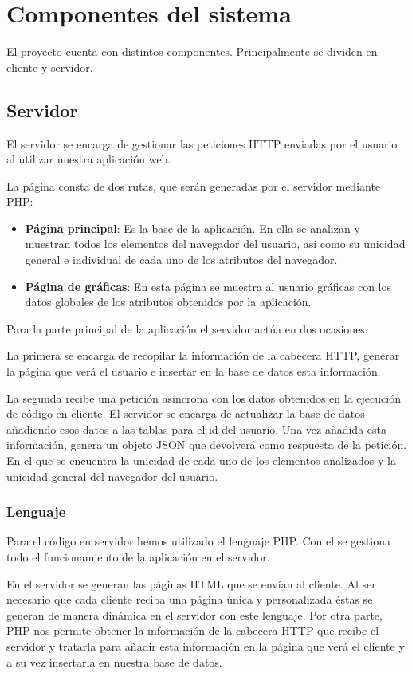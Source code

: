 \section{Componentes del sistema}
El proyecto cuenta con distintos componentes. Principalmente se dividen en cliente y servidor.
\subsection{Servidor}
El servidor se encarga de gestionar las peticiones HTTP enviadas por el usuario al utilizar nuestra aplicación web.\par
La página consta de dos rutas, que serán generadas por el servidor mediante PHP:
\begin{itemize}
    \item \textbf{Página principal}: Es la base de la aplicación. En ella se analizan y muestran todos los elementos del navegador del usuario, así como su unicidad general e individual de cada uno de los atributos del navegador.
    \item \textbf{Página de gráficas}: En esta página se muestra al usuario gráficas con los datos globales de los atributos obtenidos por la aplicación.
\end{itemize}
Para la parte principal de la aplicación el servidor actúa en dos ocasiones. \par
La primera se encarga de recopilar la información de la cabecera HTTP, generar la página que verá el usuario e insertar en la base de datos esta información.\par 
La segunda recibe una petición asíncrona con los datos obtenidos en la ejecución de código en cliente. El servidor se encarga de actualizar la base de datos añadiendo esos datos a las tablas para el id del usuario. Una vez añadida esta información, genera un objeto JSON que devolverá como respuesta de la petición. En el que se encuentra la unicidad de cada uno de los elementos analizados y la unicidad general del navegador del usuario.
\subsubsection{Lenguaje}
Para el código en servidor hemos utilizado el lenguaje PHP. Con el se gestiona todo el funcionamiento de la aplicación en el servidor.\par
En el servidor se generan las páginas HTML que se envían al cliente. Al ser necesario que cada cliente reciba una página única y personalizada éstas se generan de manera dinámica en el servidor con este lenguaje. Por otra parte, PHP nos permite obtener la información de la cabecera HTTP que recibe el servidor y tratarla para añadir esta información en la página que verá el cliente y a su vez insertarla en nuestra base de datos.\par
\newpage
